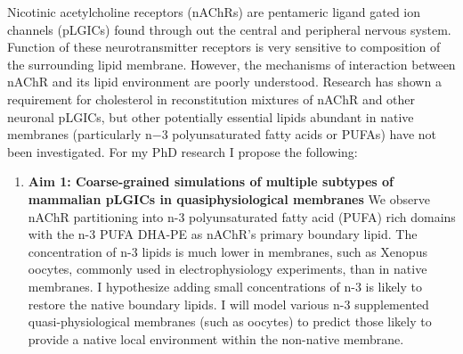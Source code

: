 Nicotinic acetylcholine receptors (nAChRs) are pentameric ligand gated ion channels (pLGICs) found through out the central and peripheral nervous system. Function of these neurotransmitter receptors is very sensitive to composition of the surrounding lipid membrane. However, the mechanisms of interaction between nAChR and its lipid environment are poorly understood. Research has shown a requirement for cholesterol in reconstitution mixtures of nAChR and other neuronal pLGICs, but other potentially essential lipids abundant in native membranes (particularly n−3 polyunsaturated fatty acids or PUFAs) have not been investigated. For my PhD research I propose the following:

\begin{enumerate}
  \item \textbf{Aim 1: Coarse-grained simulations of multiple subtypes of mammalian pLGICs in quasiphysiological membranes}  We observe nAChR partitioning into  n-3 polyunsaturated fatty acid (PUFA)  rich domains with the n-3 PUFA DHA-PE as nAChR's primary boundary lipid. The concentration of n-3 lipids is much lower in membranes, such as Xenopus oocytes,  commonly used in electrophysiology experiments, than in native membranes. I hypothesize adding small concentrations of n-3 is likely to restore the native boundary lipids. I will model various n-3 supplemented quasi-physiological membranes (such as oocytes) to predict those likely to provide a native local environment within the non-native membrane.%


\end{enumerate}
